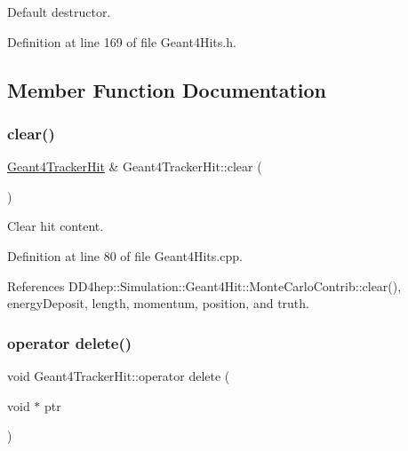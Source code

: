 Default destructor. 



Definition at line 169 of file Geant4\+Hits.\+h.



\subsection{Member Function Documentation}
\hypertarget{class_d_d4hep_1_1_simulation_1_1_geant4_tracker_hit_ae4ad76e698755a72feaf4c7f38d5281f}{}\label{class_d_d4hep_1_1_simulation_1_1_geant4_tracker_hit_ae4ad76e698755a72feaf4c7f38d5281f} 
\subsubsection{\texorpdfstring{clear()}{clear()}}
{\footnotesize\ttfamily \hyperlink{class_d_d4hep_1_1_simulation_1_1_geant4_tracker_hit}{Geant4\+Tracker\+Hit} \& Geant4\+Tracker\+Hit\+::clear (\begin{DoxyParamCaption}{ }\end{DoxyParamCaption})}



Clear hit content. 



Definition at line 80 of file Geant4\+Hits.\+cpp.



References D\+D4hep\+::\+Simulation\+::\+Geant4\+Hit\+::\+Monte\+Carlo\+Contrib\+::clear(), energy\+Deposit, length, momentum, position, and truth.

\hypertarget{class_d_d4hep_1_1_simulation_1_1_geant4_tracker_hit_a40caf2e6d8ebdf643bd26f27aff917b0}{}\label{class_d_d4hep_1_1_simulation_1_1_geant4_tracker_hit_a40caf2e6d8ebdf643bd26f27aff917b0} 
\subsubsection{\texorpdfstring{operator delete()}{operator delete()}}
{\footnotesize\ttfamily void Geant4\+Tracker\+Hit\+::operator delete (\begin{DoxyParamCaption}\item[{void $\ast$}]{ptr }\end{DoxyParamCaption})}



